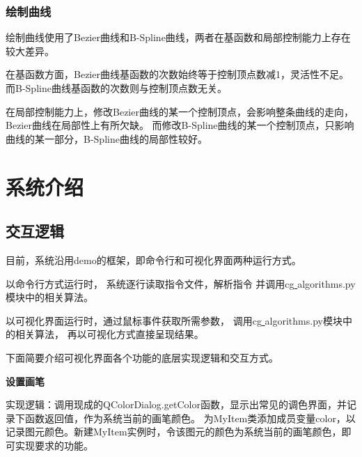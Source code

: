 \documentclass[a4paper,UTF8]{article}
\theoremstyle{definition}
\begin{document}
\subsubsection{绘制曲线}
绘制曲线使用了Bezier曲线和B-Spline曲线，两者在基函数和局部控制能力上存在较大差异。

在基函数方面，Bezier曲线基函数的次数始终等于控制顶点数减1，灵活性不足。
而B-Spline曲线基函数的次数则与控制顶点数无关。

在局部控制能力上，修改Bezier曲线的某一个控制顶点，会影响整条曲线的走向，Bezier曲线在局部性上有所欠缺。
而修改B-Spline曲线的某一个控制顶点，只影响曲线的某一部分，B-Spline曲线的局部性较好。



\section{系统介绍}
\subsection{交互逻辑}
目前，系统沿用demo的框架，即命令行和可视化界面两种运行方式。

以命令行方式运行时，
系统逐行读取指令文件，解析指令
并调用cg\underline{ }algorithms.py模块中的相关算法。

以可视化界面运行时，通过鼠标事件获取所需参数，
调用cg\underline{ }algorithms.py模块中的相关算法，
再以可视化方式直接呈现结果。

下面简要介绍可视化界面各个功能的底层实现逻辑和交互方式。

\textbf{设置画笔}

实现逻辑：调用现成的QColorDialog.getColor函数，显示出常见的调色界面，并记录下函数返回值，作为系统当前的画笔颜色。
为MyItem类添加成员变量color，以记录图元颜色。新建MyItem实例时，令该图元的颜色为系统当前的画笔颜色，即可实现要求的功能。
\end{document}
